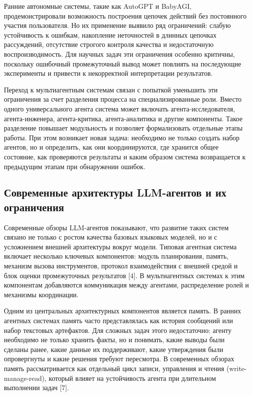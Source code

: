 Ранние автономные системы, такие как AutoGPT и BabyAGI, продемонстрировали возможность построения цепочек действий без постоянного участия пользователя. Но их применение выявило ряд ограничений: слабую устойчивость к ошибкам, накопление неточностей в длинных цепочках рассуждений, отсутствие строгого контроля качества и недостаточную воспроизводимость. Для научных задач эти ограничения особенно критичны, поскольку ошибочный промежуточный вывод может повлиять на последующие эксперименты и привести к некорректной интерпретации результатов.

Переход к мультиагентным системам связан с попыткой уменьшить эти ограничения за счет разделения процесса на специализированные роли. Вместо одного универсального агента система может включать агента-исследователя, агента-инженера, агента-критика, агента-аналитика и другие компоненты. Такое разделение повышает модульность и позволяет формализовать отдельные этапы работы. При этом возникает новая задача: необходимо не только создать набор агентов, но и определить, как они координируются, где хранится общее состояние, как проверяются результаты и каким образом система возвращается к предыдущим этапам при обнаружении ошибок.

\subsection{Современные архитектуры LLM-агентов и их ограничения}

Современные обзоры LLM-агентов показывают, что развитие таких систем связано не только с ростом качества базовых языковых моделей, но и с усложнением внешней архитектуры вокруг модели. Типовая агентная система включает несколько ключевых компонентов: модуль планирования, память, механизм вызова инструментов, протокол взаимодействия с внешней средой и блок оценки промежуточных результатов [4]. В мультиагентных системах к этим компонентам добавляются коммуникация между агентами, распределение ролей и механизмы координации.

Одним из центральных архитектурных компонентов является память. В ранних агентных системах память часто представлялась как история сообщений или набор текстовых артефактов. Для сложных задач этого недостаточно: агенту необходимо не только хранить факты, но и понимать, какие выводы были сделаны ранее, какие данные их поддерживают, какие утверждения были опровергнуты и какие решения требуют пересмотра. В современных обзорах память рассматривается как отдельный цикл записи, управления и чтения (write-manage-read), который влияет на устойчивость агента при длительном выполнении задач [7].

